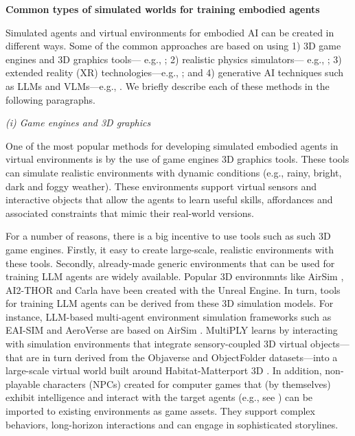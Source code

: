 \documentclass[10pt,journal,compsoc]{IEEEtran}
\begin{document}
	
	\textbf{Common types of simulated worlds for training embodied agents}
	
	Simulated agents and virtual environments for embodied AI can be created in different ways. Some of the common approaches are based on using 1) 3D game engines and 3D graphics tools— e.g., \cite{zhao2025see,gong2023mindagent}; 2) realistic physics simulators— e.g., \cite{coumans2016pybullet,yu2024mhrc,bhat2024grounding}; 3) extended reality (XR) technologies—e.g., \cite{buldu2024cuify,de2024llmr}; and 4) generative AI techniques such as LLMs and VLMs—e.g., \cite{zala2024envgen,wang2024can}. We briefly describe each of these methods in the following paragraphs. 
	
	
	\textit{(i) Game engines and 3D graphics}
	
	One of the most popular methods for developing simulated embodied agents in virtual environments is by the use of game engines 3D graphics tools. These tools can simulate realistic environments with dynamic conditions (e.g., rainy, bright, dark and foggy weather). These environments support virtual sensors and interactive objects that allow the agents to learn useful skills, affordances and associated constraints that mimic their real-world versions. 
	
	For a number of reasons, there is a big incentive to use tools such as such 3D game engines. Firstly, it easy to create large-scale, realistic environments with these tools. Secondly, already-made generic environments that can be used for training LLM agents are widely available. Popular 3D environmnts like AirSim \cite{shah2018airsim}, AI2-THOR \cite{kolve2017ai2} and Carla \cite{dosovitskiy2017carla} have been created with the Unreal Engine. In turn, tools for training LLM agents can be derived from these 3D simulation models. For instance, LLM-based multi-agent environment simulation frameworks such as EAI-SIM \cite{liu2024eai} and AeroVerse \cite{yao2024aeroverse} are based on AirSim \cite{shah2018airsim}. MultiPLY \cite{hong2024multiply} learns by interacting with simulation environments that integrate sensory-coupled 3D virtual objects—that are in turn derived from the Objaverse \cite{deitke2023objaverse} and ObjectFolder \cite{gao2021objectfolder}  datasets—into a large-scale virtual world built around  Habitat-Matterport 3D \cite{ramakrishnan2021habitat}. In addition, non-playable characters (NPCs) \cite{rodrigues2021shriek,mehta2022exploring} created for computer games that (by themselves) exhibit intelligence and interact with the target agents (e.g., see \cite{christiansen2024exploring}) can be imported to existing environments as game assets. They support complex behaviors, long-horizon interactions and can engage in sophisticated storylines. 
	
\end{document}
